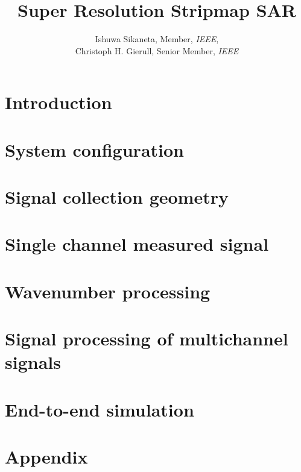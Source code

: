 \documentclass[10pt,oneside]{book}
\title{Super Resolution Stripmap SAR}
\author{Ishuwa Sikaneta, Member, \textsl{IEEE},\\ Christoph H. Gierull, Senior Member, \textsl{IEEE}}
\begin{document}
\maketitle
\tableofcontents
\chapter{Introduction}


\chapter{System configuration}


\chapter{Signal collection geometry}






\chapter{Single channel measured signal}


\chapter{Wavenumber processing}



\chapter{Signal processing of multichannel signals}


\chapter{End-to-end simulation}



\printbibliography
\appendix
\chapter{Appendix}







\end{document}
